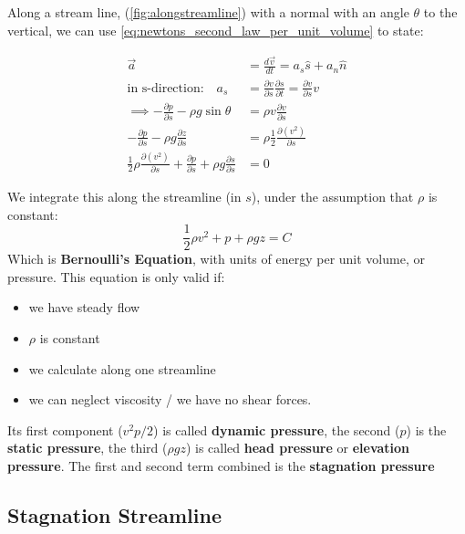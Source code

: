 Along a stream line, (\ref{fig:alongstreamline}) with a normal with an angle $\theta$ to the vertical, we can use \eqref{eq:newtons_second_law_per_unit_volume} to state:


\begin{equation*}
	\begin{split}
		\vec a &= \frac{d\vec v}{dt} = a_s \hat s + a_n \hat n\\
		\text{in s-direction:}\quad a_s &= \frac{\partial v}{\partial s} \frac{\partial s}{\partial t} = \frac{\partial v}{\partial s} v\\
		\implies -\frac{\partial p}{\partial s} - \rho g\sin\theta &= \rho v\frac{\partial v}{\partial s}\\
		-\frac{\partial p}{\partial s} - \rho g \frac{\partial z}{\partial s} &= \rho \frac 12 \frac{\partial (v^2)}{\partial s}\\
		\frac 12 \rho \frac{\partial (v^2)}{\partial s} + \frac{\partial p}{\partial s} + \rho g \frac{\partial s}{\partial s} &= 0
	\end{split}
\end{equation*}

We integrate this along the streamline (in $s$), under the assumption that $\rho$ is constant:
\begin{equation*}
	\boxed{\frac 12 \rho v^2 + p + \rho g z = C}
	\label{eq:bernoullis_equation}
\end{equation*}
Which is \textbf{Bernoulli's Equation}, with units of energy per unit volume, or pressure. This equation is only valid if:
\begin{itemize}
	\item we have steady flow
	\item $\rho$ is constant
	\item we calculate along one streamline
	\item we can neglect viscosity / we have no shear forces.
\end{itemize}

Its first component ($v^2p/2$) is called \textbf{dynamic pressure}, the second ($p$) is the \textbf{static pressure}, the third ($\rho gz$) is called \textbf{head pressure} or \textbf{elevation pressure}. The first and second term combined is the \textbf{stagnation pressure}

\subsection{Stagnation Streamline}


